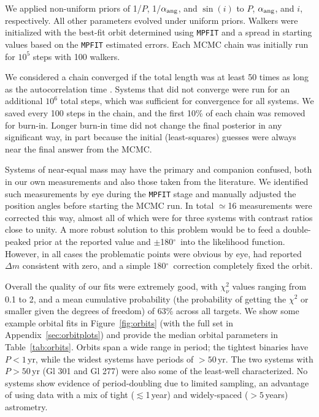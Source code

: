 \documentclass[twocolumn]{aastex62}
\newcommand{\degree}{$^{\circ}$}
\begin{document}
We applied non-uniform priors of 1/$P$, 1/$\alpha_{\rm{ang}}$, and $\sin(i)$ to $P$, $\alpha_{\rm{ang}}$, and $i$, respectively. All other parameters evolved under uniform priors. Walkers were initialized with the best-fit orbit determined using {\tt MPFIT} \citep{Markwart2009} and a spread in starting values based on the {\tt MPFIT} estimated errors. Each MCMC chain was initially run for $10^5$ steps with 100 walkers. 

We considered a chain converged if the total length was at least 50 times as long as the autocorrelation time \citep{2010CAMCS...5...65G}. Systems that did not converge were run for an additional $10^6$ total steps, which was sufficient for convergence for all systems. We saved every 100 steps in the chain, and the first 10\% of each chain was removed for burn-in. Longer burn-in time did not change the final posterior in any significant way, in part because the initial (least-squares) guesses were always near the final answer from the MCMC. 

Systems of near-equal mass may have the primary and companion confused, both in our own measurements and also those taken from the literature. We identified such measurements by eye during the {\tt MPFIT} stage and manually adjusted the position angles before starting the MCMC run. In total $\simeq$16 measurements were corrected this way, almost all of which were for three systems with contrast ratios close to unity. A more robust solution to this problem would be to feed a double-peaked prior at the reported value and $\pm$180\degree\ into the likelihood function. However, in all cases the problematic points were obvious by eye, had reported $\Delta m$ consistent with zero, and a simple 180\degree\ correction completely fixed the orbit. 

Overall the quality of our fits were extremely good, with $\chi^2_\nu$ values ranging from 0.1 to 2, and a mean cumulative probability (the probability of getting the $\chi^2$ or smaller given the degrees of freedom) of 63\% across all targets. We show some example orbital fits in Figure~\ref{fig:orbits} (with the full set in Appendix~\ref{sec:orbitplots}) and provide the median orbital parameters in Table~\ref{tab:orbits}. Orbits span a wide range in period; the tightest binaries have $P<1$\,yr, while the widest systems have periods of $>50$\,yr. The two systems with $P>50$\,yr (Gl 301 and Gl 277) were also some of the least-well characterized. No systems show evidence of period-doubling due to limited sampling, an advantage of using data with a mix of tight ($\lesssim$1\,year) and widely-spaced ($>5$\,years) astrometry.
\end{document}
